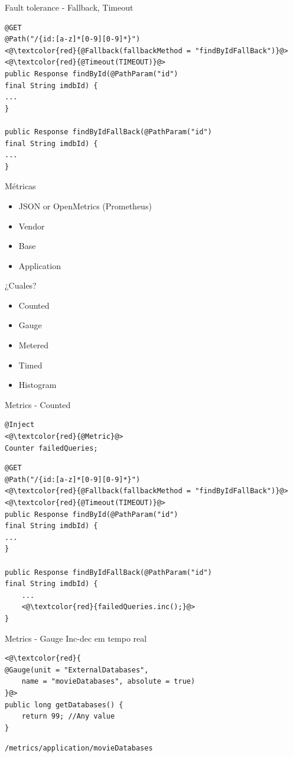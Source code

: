 \documentclass{beamer}
\begin{document}
\begin{frame}[fragile]{Fault tolerance - Fallback, Timeout}
\begin{lstlisting}
@GET
@Path("/{id:[a-z]*[0-9][0-9]*}")
<@\textcolor{red}{@Fallback(fallbackMethod = "findByIdFallBack")}@>
<@\textcolor{red}{@Timeout(TIMEOUT)}@>
public Response findById(@PathParam("id") 
final String imdbId) {
...
}

public Response findByIdFallBack(@PathParam("id") 
final String imdbId) {
...
}
\end{lstlisting}
\end{frame}


\begin{frame}{Métricas}

\begin{itemize}
	\item JSON or OpenMetrics (Prometheus)
	\item Vendor
	\item Base
	\item Application
\end{itemize}

¿Cuales? 
\begin{itemize}
	\item Counted
	\item Gauge
	\item Metered
	\item Timed
	\item Histogram
\end{itemize}

\end{frame}

\begin{frame}[fragile]{Metrics - Counted}
\begin{lstlisting}
@Inject
<@\textcolor{red}{@Metric}@>
Counter failedQueries;
\end{lstlisting}

\begin{lstlisting}
@GET
@Path("/{id:[a-z]*[0-9][0-9]*}")
<@\textcolor{red}{@Fallback(fallbackMethod = "findByIdFallBack")}@>
<@\textcolor{red}{@Timeout(TIMEOUT)}@>
public Response findById(@PathParam("id") 
final String imdbId) {
...
}

public Response findByIdFallBack(@PathParam("id") 
final String imdbId) {
	...
	<@\textcolor{red}{failedQueries.inc();}@>
}
\end{lstlisting}
\end{frame}

\begin{frame}[fragile]{Metrics - Gauge}
Inc-dec em tempo real 
\begin{lstlisting}
<@\textcolor{red}{
@Gauge(unit = "ExternalDatabases",
	name = "movieDatabases", absolute = true)
}@>
public long getDatabases() {
	return 99; //Any value
}
\end{lstlisting}

\lstinline|/metrics/application/movieDatabases|
\end{frame}
\end{document}
